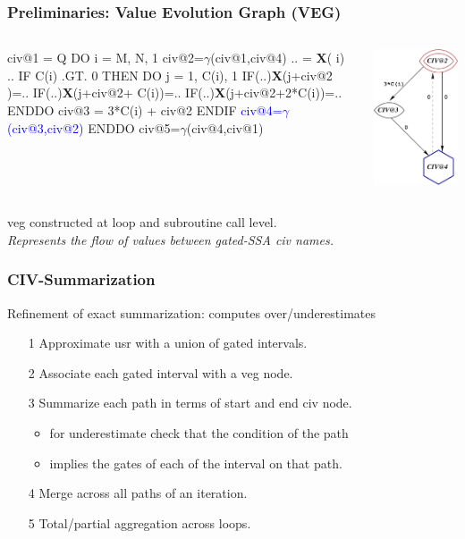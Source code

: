 \documentclass{beamer}
\newcommand{\blue}[1]{\textcolor{Blue}{{#1}}}
\newcommand{\emp}[1]{\textcolor{DikuRed}{ #1}}
\newcommand{\emphh}[1]{\textcolor{CosGreen}{ #1}}
\newcommand{\mymath}[1]{$ #1 $}
\begin{document}
\begin{frame}[fragile,t]
\frametitle{Preliminaries: Value Evolution Graph (VEG)}

\begin{columns}
\begin{colorcode}[fontsize=\small]
civ@1 = Q
DO i = M, N, 1
 \emp{civ@2=\mymath{\gamma}(civ@1,civ@4)}
 .. = {\bf X}(\emp{i}) ..
 IF C(i) .GT. 0 THEN
  DO j = 1, C(i), 1
   IF(..){\bf{}X}(j+civ@2       )=..
   IF(..){\bf{}X}(j+civ@2+  C(i))=..
   IF(..){\bf{}X}(j+civ@2+2*C(i))=..
  ENDDO
  civ@3 = 3*C(i) + civ@2
 ENDIF
 \blue{civ@4=\mymath{\gamma}(civ@3,civ@2)}
ENDDO
civ@5=\mymath{\gamma}(civ@4,civ@1)
\end{colorcode}
\includegraphics[height=35ex]{Figures/VEG_CORREC0.pdf}
\end{columns}
\bigskip

{\sc veg} constructed at loop and subroutine call level.\\ 
\emphh{\em Represents the flow of values between gated-SSA {\sc civ} names.} 

\end{frame}




\begin{frame}[fragile,t]
\frametitle{CIV-Summarization}

Refinement of exact summarization: computes over/underestimates\medskip
\begin{itemize}
    \item[1] Approximate {\sc usr} with a union of gated intervals.\medskip
    \item[2] Associate each gated interval with a {\sc veg} node.\medskip
    \item[3] Summarize each path in terms of start and end {\sc civ} node.
            \begin{itemize}
                \item for underestimate check that the condition of the path
                \item implies the gates of each of the interval on that path.\medskip
            \end{itemize}
    \item[4] Merge across all paths of an iteration.\medskip
    \item[5] Total/partial aggregation across loops.
\end{itemize}
\end{frame}
\end{document}
